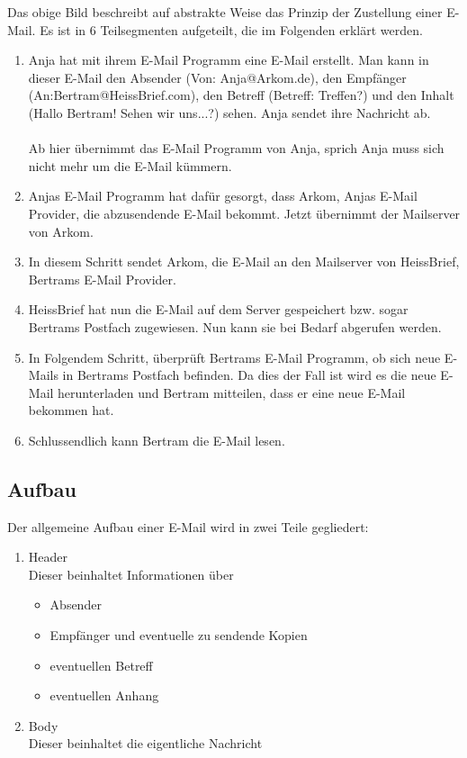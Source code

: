 \documentclass[12pt,a4paper]{report}
\begin{document}
\begin{onehalfspace}
Das obige Bild beschreibt auf abstrakte Weise das Prinzip der Zustellung einer E-Mail. Es ist in 6 Teilsegmenten aufgeteilt, die im Folgenden erklärt werden.

\begin{enumerate}
\item Anja hat mit ihrem E-Mail Programm eine E-Mail erstellt. Man kann in dieser E-Mail den Absender (Von: Anja@Arkom.de), den Empfänger (An:Bertram@HeissBrief.com), den Betreff (Betreff: Treffen?) und den Inhalt (Hallo Bertram! Sehen wir uns...?) sehen. Anja sendet ihre Nachricht ab.\\\\
Ab hier übernimmt das E-Mail Programm von Anja, sprich Anja muss sich nicht mehr um die E-Mail kümmern.
\item Anjas E-Mail Programm hat dafür gesorgt, dass Arkom,  Anjas E-Mail Provider, die abzusendende E-Mail bekommt. Jetzt übernimmt der Mailserver von Arkom.
\item In diesem Schritt sendet Arkom, die E-Mail an den Mailserver von HeissBrief, Bertrams E-Mail Provider.
\item HeissBrief hat nun die E-Mail auf dem Server gespeichert bzw. sogar Bertrams Postfach zugewiesen. Nun kann sie bei Bedarf abgerufen werden.
\item In Folgendem Schritt, überprüft Bertrams E-Mail Programm, ob sich neue E-Mails in Bertrams Postfach befinden. Da dies der Fall ist wird es die neue E-Mail herunterladen und Bertram mitteilen, dass er eine neue E-Mail bekommen hat.
\item Schlussendlich kann Bertram die E-Mail lesen.
\end{enumerate} 

\subsection{Aufbau}
Der allgemeine Aufbau einer E-Mail wird in zwei Teile gegliedert:
\begin{enumerate}
\item Header\\
Dieser beinhaltet Informationen über
\begin{itemize}
\item Absender
\item Empfänger und eventuelle zu sendende Kopien
\item eventuellen Betreff
\item eventuellen Anhang
\end{itemize}
\item Body\\
Dieser beinhaltet die eigentliche Nachricht
\end{enumerate} 

\end{onehalfspace}
\end{document}
